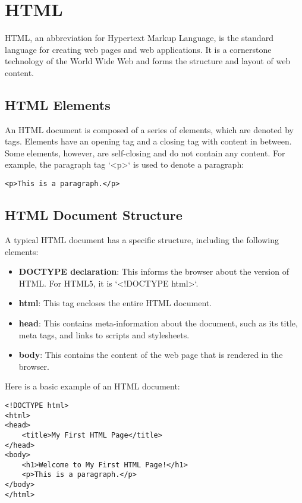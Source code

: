 \chapter{HTML}

HTML, an abbreviation for Hypertext Markup Language, is the standard
language for creating web pages and web applications. It is a
cornerstone technology of the World Wide Web and forms the structure
and layout of web content.

\section{HTML Elements}

An HTML document is composed of a series of elements, which are
denoted by tags. Elements have an opening tag and a closing tag with
content in between. Some elements, however, are self-closing and do
not contain any content. For example, the paragraph tag `<p>` is used
to denote a paragraph:

\begin{verbatim}
<p>This is a paragraph.</p>
\end{verbatim}

\section{HTML Document Structure}

A typical HTML document has a specific structure, including the following elements:

\begin{itemize}
    \item \textbf{DOCTYPE declaration}: This informs the browser about
      the version of HTML. For HTML5, it is `<!DOCTYPE html>`.
    \item \textbf{html}: This tag encloses the entire HTML document.
    \item \textbf{head}: This contains meta-information about the
      document, such as its title, meta tags, and links to scripts and
      stylesheets.
    \item \textbf{body}: This contains the content of the web page
      that is rendered in the browser.
\end{itemize}

Here is a basic example of an HTML document:

\begin{verbatim}
<!DOCTYPE html>
<html>
<head>
    <title>My First HTML Page</title>
</head>
<body>
    <h1>Welcome to My First HTML Page!</h1>
    <p>This is a paragraph.</p>
</body>
</html>
\end{verbatim}
